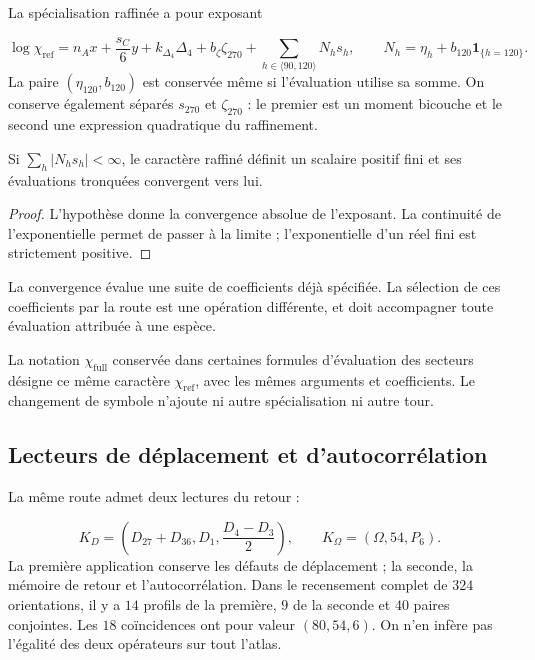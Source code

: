 La spécialisation raffinée a pour exposant

\[
 \log\chi_{\mathrm{ref}}=n_Ax+\frac{s_C}{6}y+k_{\Delta_4}\Delta_4
 +b_{\zeta}\zeta_{270}+\sum_{h\in\langle90,120\rangle}N_hs_h,
 \qquad N_h=\eta_h+b_{120}\mathbf1_{\{h=120\}}.
\]
La paire \((\eta_{120},b_{120})\) est conservée même si l’évaluation utilise
sa somme. On conserve également séparés \(s_{270}\) et
\(\zeta_{270}\) : le premier est un moment bicouche et le second une
expression quadratique du raffinement.


\begin{proposition}
Si \(\sum_h|N_hs_h|<\infty\), le caractère raffiné définit un scalaire
positif fini et ses évaluations tronquées convergent vers lui.

\end{proposition}
\begin{proof}
L’hypothèse donne la convergence absolue de l’exposant. La continuité de
l’exponentielle permet de passer à la limite ; l’exponentielle d’un réel fini est
strictement positive.

\end{proof}

La convergence évalue une suite de coefficients déjà spécifiée.
La sélection de ces coefficients par la route est une opération différente,
et doit accompagner toute évaluation attribuée à une espèce.


La notation \(\chi_{\mathrm{full}}\) conservée dans certaines formules
d’évaluation des secteurs désigne ce même caractère
\(\chi_{\mathrm{ref}}\), avec les mêmes arguments et coefficients.
Le changement de symbole n’ajoute ni autre spécialisation ni autre tour.


\subsection{Lecteurs de déplacement et d’autocorrélation
}

La même route admet deux lectures du retour :

\[
 K_D=\left(D_{27}+D_{36},D_1,\frac{D_4-D_3}{2}\right),\qquad
 K_\Omega=(\Omega,54,P_6).
\]
La première application conserve les défauts de déplacement ; la seconde, la mémoire de
retour et l’autocorrélation. Dans le recensement complet de \(324\) orientations,
il y a \(14\) profils de la première, \(9\) de la seconde et \(40\) paires
conjointes. Les \(18\) coïncidences ont pour valeur \((80,54,6)\).
On n’en infère pas l’égalité des deux opérateurs sur tout l’atlas.


